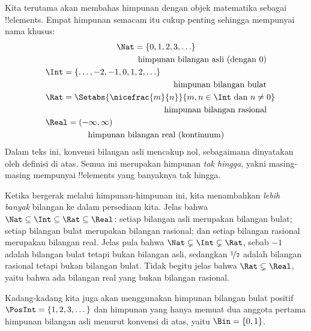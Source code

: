 \documentclass[../../../include/open-logic-section]{subfiles}
\begin{document}

\begin{ex}
Kita terutama akan membahas himpunan dengan objek matematika sebagai
!!{element}s. Empat himpunan semacam itu cukup penting sehingga
mempunyai nama khusus:
\begin{multline*}
    \Nat = \{0, 1, 2, 3, \ldots\} \\
    \shoveright{\text{himpunan bilangan asli (dengan 0)}}\\
    \shoveleft{\Int = \{\ldots, -2, -1, 0, 1, 2, \ldots\}} \\
    \shoveright{\text{himpunan bilangan bulat}}\\
    \shoveleft{\Rat = \Setabs{\nicefrac{m}{n}}{m, n \in \Int\text{ dan }n \neq 0}}\\
    \shoveright{\text{himpunan bilangan rasional}}\\
    \shoveleft{\Real = (-\infty, \infty)}\\
    \text{himpunan bilangan real (kontinuum)}
\end{multline*}
Dalam teks ini, konvensi bilangan asli mencakup nol, sebagaimana
dinyatakan oleh definisi di atas.
Semua ini merupakan himpunan \emph{tak hingga}, yakni masing-masing
mempunyai !!{element}s yang banyaknya tak hingga.

Ketika bergerak melalui himpunan-himpunan ini, kita menambahkan
\emph{lebih banyak} bilangan ke dalam persediaan kita. Jelas bahwa
$\Nat \subseteq \Int \subseteq \Rat \subseteq \Real$: setiap bilangan
asli merupakan bilangan bulat; setiap bilangan bulat merupakan bilangan
rasional; dan setiap bilangan rasional merupakan bilangan real. Jelas
pula bahwa $\Nat \subsetneq \Int \subsetneq \Rat$, sebab $-1$ adalah
bilangan bulat tetapi bukan bilangan asli, sedangkan $\nicefrac{1}{2}$
adalah bilangan rasional tetapi bukan bilangan bulat. Tidak begitu
jelas bahwa $\Rat \subsetneq \Real$, yaitu bahwa ada bilangan real yang
bukan bilangan rasional.

Kadang-kadang kita juga akan menggunakan himpunan bilangan bulat
positif $\PosInt = \{1, 2, 3, \dots\}$ dan himpunan yang hanya memuat
dua anggota pertama himpunan bilangan asli menurut konvensi di atas,
yaitu $\Bin = \{0, 1\}$.
\end{ex}
\end{document}
